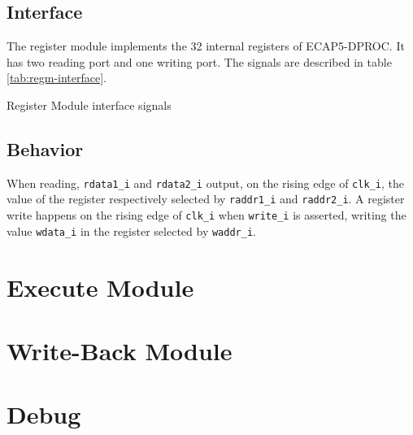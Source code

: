\subsection{Interface}

\begin{content}
The register module implements the 32 internal registers of ECAP5-DPROC. It has two reading port and one writing port. The signals are described in table \ref{tab:regm-interface}. 
\end{content}

\begin{table}[H]
  \centering
  
  \caption{Register Module interface signals}
  \label{tab:regm-interface}
\end{table}

\subsection{Behavior}

\begin{content}
  When reading, \texttt{rdata1\_i} and \texttt{rdata2\_i} output, on the rising edge of \texttt{clk\_i}, the value of the register respectively selected by \texttt{raddr1\_i} and \texttt{raddr2\_i}. A register write happens on the rising edge of \texttt{clk\_i} when \texttt{write\_i} is asserted, writing the value \texttt{wdata\_i} in the register selected by \texttt{waddr\_i}.
\end{content}

\newpage

\section{Execute Module}
\newpage

\section{Write-Back Module}
\newpage

\section{Debug}
\newpage
